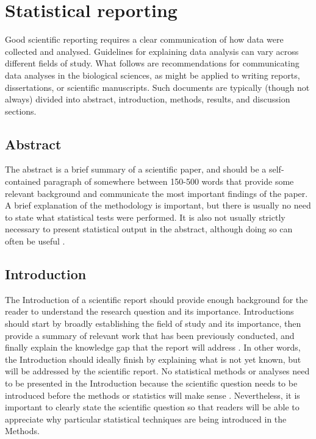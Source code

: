 \documentclass[
]{scrbook}
\begin{document}
\hypertarget{statistical-reporting}{%
\section{Statistical reporting}\label{statistical-reporting}}

Good scientific reporting requires a clear communication of how data were collected and analysed.
Guidelines for explaining data analysis can vary across different fields of study.
What follows are recommendations for communicating data analyses in the biological sciences, as might be applied to writing reports, dissertations, or scientific manuscripts.
Such documents are typically (though not always) divided into abstract, introduction, methods, results, and discussion sections.

\hypertarget{abstract}{%
\subsection{Abstract}\label{abstract}}

The abstract is a brief summary of a scientific paper, and should be a self-contained paragraph of somewhere between 150-500 words that provide some relevant background and communicate the most important findings of the paper.
A brief explanation of the methodology is important, but there is usually no need to state what statistical tests were performed.
It is also not usually strictly necessary to present statistical output in the abstract, although doing so can often be useful \citep{Andrade2011}.

\hypertarget{introduction}{%
\subsection{Introduction}\label{introduction}}

The Introduction of a scientific report should provide enough background for the reader to understand the research question and its importance.
Introductions should start by broadly establishing the field of study and its importance, then provide a summary of relevant work that has been previously conducted, and finally explain the knowledge gap that the report will address \citep{Woodford1999, Turbek2016}.
In other words, the Introduction should ideally finish by explaining what is not yet known, but will be addressed by the scientific report.
No statistical methods or analyses need to be presented in the Introduction because the scientific question needs to be introduced before the methods or statistics will make sense \citep{Bouma2000}.
Nevertheless, it is important to clearly state the scientific question so that readers will be able to appreciate why particular statistical techniques are being introduced in the Methods.
\end{document}
